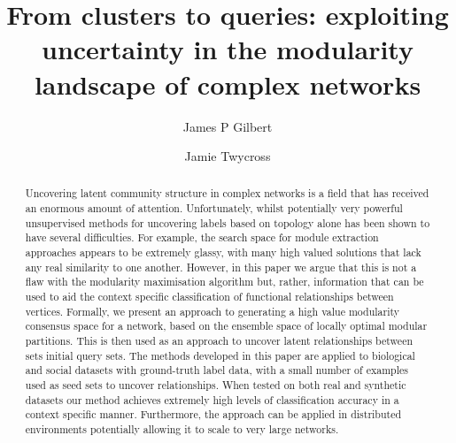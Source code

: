 \documentclass[sigconf]{acmart}
\begin{document}
\title{From clusters to queries: exploiting uncertainty in the modularity landscape of complex networks}

\author{James P Gilbert}

\author{Jamie Twycross}



\begin{abstract}
Uncovering latent community structure in complex networks is a field that has received an enormous amount of attention.
Unfortunately, whilst potentially very powerful unsupervised methods for uncovering labels based on topology alone has been shown to have several difficulties.
For example, the search space for module extraction approaches appears to be extremely glassy, with many high valued solutions that lack any real similarity to one another.
However, in this paper we argue that this is not a flaw with the modularity maximisation algorithm but, rather, information that can be used to aid the context specific classification of functional relationships between vertices.
Formally, we present an approach to generating a high value modularity consensus space for a network, based on the ensemble space of locally optimal modular partitions.
This is then used as an approach to uncover latent relationships between sets initial query sets.
The methods developed in this paper are applied to biological and social datasets with ground-truth label data, with a small number of examples used as seed sets to uncover relationships.
When tested on both real and synthetic datasets our method achieves extremely high levels of classification accuracy in a context specific manner.
Furthermore, the approach can be applied in distributed environments potentially allowing it to scale to very large networks.
\end{abstract}

\maketitle
\end{document}
